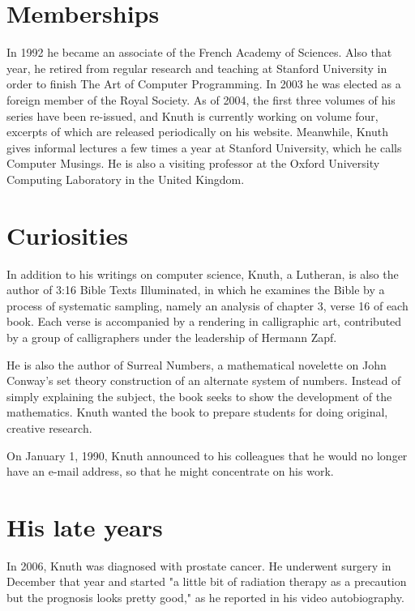 \documentclass[10pt,letterpaper]{article}
\begin{document}
\section{Memberships}

In 1992 he became an associate of the French Academy of Sciences. Also
that year, he retired from regular research and teaching at Stanford 
University in order to finish The Art of Computer Programming. In 2003 
he was elected as a foreign member of the Royal Society. As of 2004, 
the first three volumes of his series have been re-issued, and Knuth is 
currently working on volume four, excerpts of which are released periodically 
on his website. Meanwhile, Knuth gives informal lectures a few times a 
year at Stanford University, which he calls Computer Musings. He is also a 
visiting professor at the Oxford University Computing Laboratory in the 
United Kingdom.

\section{Curiosities}

In addition to his writings on computer science, Knuth, a Lutheran, 
is also the author of 3:16 Bible Texts Illuminated, in which he 
examines the Bible by a process of systematic sampling, namely an 
analysis of chapter 3, verse 16 of each book. Each verse is accompanied 
by a rendering in calligraphic art, contributed by a group of calligraphers 
under the leadership of Hermann Zapf.

He is also the author of Surreal Numbers, a mathematical novelette 
on John Conway's set theory construction of an alternate system of 
numbers. Instead of simply explaining the subject, the book seeks to 
show the development of the mathematics. Knuth wanted the book to 
prepare students for doing original, creative research.

On January 1, 1990, Knuth announced to his colleagues that he would 
no longer have an e-mail address, so that he might concentrate on his work.

\section{His late years}

In 2006, Knuth was diagnosed with prostate cancer. He underwent surgery 
in December that year and started "a little bit of radiation therapy  
as a precaution but the prognosis looks pretty good," as he reported 
in his video autobiography.
\end{document}
